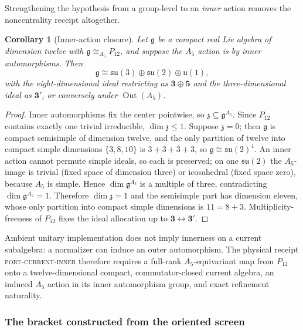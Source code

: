 \documentclass[11pt]{article}
\newtheorem{corollary}[theorem]{Corollary}
\begin{document}
Strengthening the hypothesis from a group-level to an \emph{inner} action
removes the noncentrality receipt altogether.

\begin{corollary}[Inner-action closure]
Let \(\mathfrak g\) be a compact real Lie algebra of dimension twelve with
\(\mathfrak g\cong_{A_5}P_{12}\), and suppose the \(A_5\) action is by inner
automorphisms. Then
\[
  \mathfrak g\cong\mathfrak{su}(3)\oplus\mathfrak{su}(2)\oplus\mathfrak u(1),
\]
with the eight-dimensional ideal restricting as \(\mathbf3\oplus\mathbf5\) and
the three-dimensional ideal as \(\mathbf3'\), or conversely under
\(\operatorname{Out}(A_5)\).
\end{corollary}

\begin{proof}
Inner automorphisms fix the center pointwise, so
\(\mathfrak z\subseteq\mathfrak g^{A_5}\). Since \(P_{12}\) contains exactly one
trivial irreducible, \(\dim\mathfrak z\le1\). Suppose \(\mathfrak z=0\); then
\(\mathfrak g\) is compact semisimple of dimension twelve, and the only
partition of twelve into compact simple dimensions \(\{3,8,10\}\) is
\(3+3+3+3\), so \(\mathfrak g\cong\mathfrak{su}(2)^4\). An inner action cannot
permute simple ideals, so each is preserved; on one \(\mathfrak{su}(2)\) the
\(A_5\)-image is trivial (fixed space of dimension three) or icosahedral (fixed
space zero), because \(A_5\) is simple. Hence \(\dim\mathfrak g^{A_5}\) is a
multiple of three, contradicting \(\dim\mathfrak g^{A_5}=1\). Therefore
\(\dim\mathfrak z=1\) and the semisimple part has dimension eleven, whose only
partition into compact simple dimensions is \(11=8+3\). Multiplicity-freeness
of \(P_{12}\) fixes the ideal allocation up to
\(\mathbf3\leftrightarrow\mathbf3'\).
\end{proof}

Ambient unitary implementation does not imply innerness on a current
subalgebra: a normalizer can induce an outer automorphism. The physical receipt
\textsc{port-current-inner} therefore requires a full-rank
\(A_5\)-equivariant map from \(P_{12}\) onto a twelve-dimensional compact,
commutator-closed current algebra, an induced \(A_5\) action in its inner
automorphism group, and exact refinement naturality.

\subsubsection*{The bracket constructed from the oriented screen}
\end{document}
